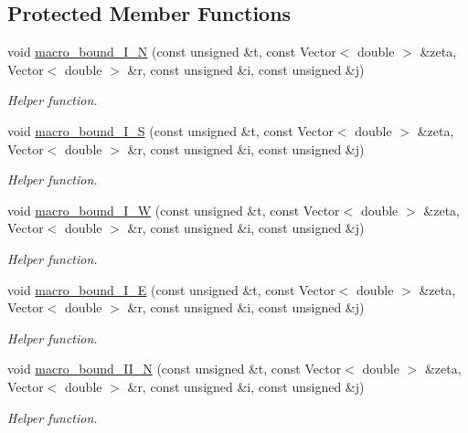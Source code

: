 \subsection*{Protected Member Functions}
\begin{DoxyCompactItemize}
\item 
void \hyperlink{classoomph_1_1ChannelWithLeafletDomain_a08d97680e95f42a385a869d5c384e610}{macro\+\_\+bound\+\_\+\+I\+\_\+N} (const unsigned \&t, const Vector$<$ double $>$ \&zeta, Vector$<$ double $>$ \&r, const unsigned \&i, const unsigned \&j)
\begin{DoxyCompactList}\small\item\em Helper function. \end{DoxyCompactList}\item 
void \hyperlink{classoomph_1_1ChannelWithLeafletDomain_a20898c8b6747cf01e3e92e4a5c6ff5e4}{macro\+\_\+bound\+\_\+\+I\+\_\+S} (const unsigned \&t, const Vector$<$ double $>$ \&zeta, Vector$<$ double $>$ \&r, const unsigned \&i, const unsigned \&j)
\begin{DoxyCompactList}\small\item\em Helper function. \end{DoxyCompactList}\item 
void \hyperlink{classoomph_1_1ChannelWithLeafletDomain_a15e43fe342a04c8466a43112e3a48ff3}{macro\+\_\+bound\+\_\+\+I\+\_\+W} (const unsigned \&t, const Vector$<$ double $>$ \&zeta, Vector$<$ double $>$ \&r, const unsigned \&i, const unsigned \&j)
\begin{DoxyCompactList}\small\item\em Helper function. \end{DoxyCompactList}\item 
void \hyperlink{classoomph_1_1ChannelWithLeafletDomain_ac0bc6edb7d09bfdb310de99f846f5093}{macro\+\_\+bound\+\_\+\+I\+\_\+E} (const unsigned \&t, const Vector$<$ double $>$ \&zeta, Vector$<$ double $>$ \&r, const unsigned \&i, const unsigned \&j)
\begin{DoxyCompactList}\small\item\em Helper function. \end{DoxyCompactList}\item 
void \hyperlink{classoomph_1_1ChannelWithLeafletDomain_a1402c0d3fe42a8ffd6c9fb1d6df9d460}{macro\+\_\+bound\+\_\+\+I\+I\+\_\+N} (const unsigned \&t, const Vector$<$ double $>$ \&zeta, Vector$<$ double $>$ \&r, const unsigned \&i, const unsigned \&j)
\begin{DoxyCompactList}\small\item\em Helper function. \end{DoxyCompactList}\item 

\end{DoxyCompactItemize}
